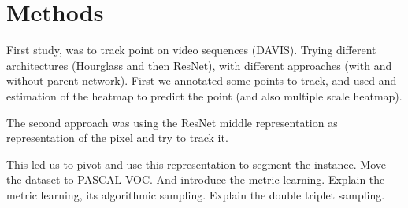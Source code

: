 
%
\newpage
\chapter{Methods}


First study, was to track point on video sequences (DAVIS). Trying different architectures (Hourglass and then ResNet), with different approaches (with and without parent network). First we annotated some points to track, and used and estimation of the heatmap to predict the point (and also multiple scale heatmap).

The second approach was using the ResNet middle representation as representation of the pixel and try to track it.

This led us to pivot and use this representation to segment the instance.
Move the dataset to PASCAL VOC. And introduce the metric learning. Explain the metric learning, its algorithmic sampling. Explain the double triplet sampling.
